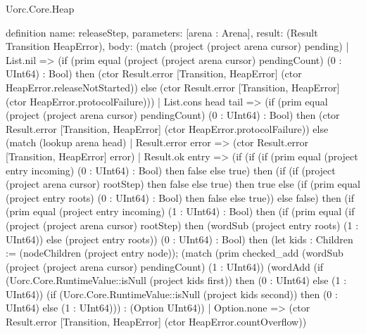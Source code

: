 \begin{lexlean}{Uorc.Core.Heap}
\begin{semanticmodule}
definition{
  name: releaseStep,
  parameters: [arena : Arena],
  result: (Result Transition HeapError),
  body: (match (project (project arena cursor) pending)
    | List.nil => (if (prim equal (project (project arena cursor) pendingCount) (0 : UInt64) : Bool) then (ctor Result.error [Transition, HeapError] (ctor HeapError.releaseNotStarted)) else (ctor Result.error [Transition, HeapError] (ctor HeapError.protocolFailure)))
    | List.cons head tail => (if (prim equal (project (project arena cursor) pendingCount) (0 : UInt64) : Bool) then (ctor Result.error [Transition, HeapError] (ctor HeapError.protocolFailure)) else (match (lookup arena head)
      | Result.error error => (ctor Result.error [Transition, HeapError] error)
      | Result.ok entry => (if (if (if (prim equal (project entry incoming) (0 : UInt64) : Bool) then false else true) then (if (if (project (project arena cursor) rootStep) then false else true) then true else (if (prim equal (project entry roots) (0 : UInt64) : Bool) then false else true)) else false) then (if (prim equal (project entry incoming) (1 : UInt64) : Bool) then (if (prim equal (if (project (project arena cursor) rootStep) then (wordSub (project entry roots) (1 : UInt64)) else (project entry roots)) (0 : UInt64) : Bool) then (let kids : Children := (nodeChildren (project entry node)); (match (prim checked_add (wordSub (project (project arena cursor) pendingCount) (1 : UInt64)) (wordAdd (if (Uorc.Core.RuntimeValue::isNull (project kids first)) then (0 : UInt64) else (1 : UInt64)) (if (Uorc.Core.RuntimeValue::isNull (project kids second)) then (0 : UInt64) else (1 : UInt64))) : (Option UInt64))
        | Option.none => (ctor Result.error [Transition, HeapError] (ctor HeapError.countOverflow))
}
\end{semanticmodule}
\end{lexlean}
